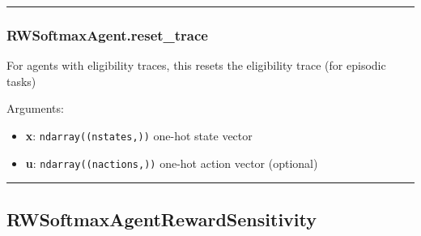 \begin{Shaded}
\begin{Highlighting}[]
\end{Highlighting}
\end{Shaded}

\begin{center}\rule{0.5\linewidth}{\linethickness}\end{center}

\hypertarget{rwsoftmaxagent.reset_trace}{%
\subsubsection{RWSoftmaxAgent.reset\_trace}\label{rwsoftmaxagent.reset_trace}}

\begin{Shaded}
\begin{Highlighting}[]
\OperatorTok{=}\NormalTok{)}
\end{Highlighting}
\end{Shaded}

For agents with eligibility traces, this resets the eligibility trace
(for episodic tasks)

Arguments:

\begin{itemize}
\tightlist
\item
  \textbf{x}: \texttt{ndarray((nstates,))} one-hot state vector
\item
  \textbf{u}: \texttt{ndarray((nactions,))} one-hot action vector
  (optional)
\end{itemize}

\begin{center}\rule{0.5\linewidth}{\linethickness}\end{center}

\hypertarget{rwsoftmaxagentrewardsensitivity}{%
\subsection{RWSoftmaxAgentRewardSensitivity}\label{rwsoftmaxagentrewardsensitivity}}

\begin{Shaded}
\begin{Highlighting}[]
\end{Highlighting}
\end{Shaded}

